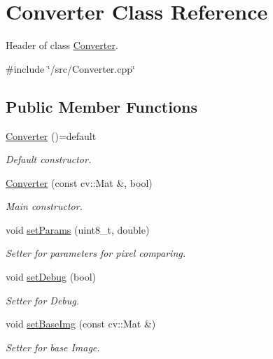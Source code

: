 \hypertarget{class_converter}{}\section{Converter Class Reference}
\label{class_converter}


Header of class \mbox{\hyperlink{class_converter}{Converter}}.  




{\ttfamily \#include \char`\"{}/src/\+Converter.\+cpp\char`\"{}}

\subsection*{Public Member Functions}
\begin{DoxyCompactItemize}
\item 
\mbox{\hyperlink{class_converter_aaa67c7d2770c60fc2fa85fccb6f8a1fc}{Converter}} ()=default
\begin{DoxyCompactList}\small\item\em Default constructor. \end{DoxyCompactList}\item 
\mbox{\hyperlink{class_converter_ae1915b3a733528dc6a99582de4e9c8bb}{Converter}} (const cv\+::\+Mat \&, bool)
\begin{DoxyCompactList}\small\item\em Main constructor. \end{DoxyCompactList}\item 
void \mbox{\hyperlink{class_converter_a96069954f786607da376b96401815216}{set\+Params}} (uint8\+\_\+t, double)
\begin{DoxyCompactList}\small\item\em Setter for parameters for pixel comparing. \end{DoxyCompactList}\item 
void \mbox{\hyperlink{class_converter_aad973b1f41c37039e66c33a60cf28e39}{set\+Debug}} (bool)
\begin{DoxyCompactList}\small\item\em Setter for Debug. \end{DoxyCompactList}\item 
void \mbox{\hyperlink{class_converter_afc5aa4ae2b38f0dd8d9418ced905e69d}{set\+Base\+Img}} (const cv\+::\+Mat \&)
\begin{DoxyCompactList}\small\item\em Setter for base Image. \end{DoxyCompactList}\item 

\end{DoxyCompactItemize}
